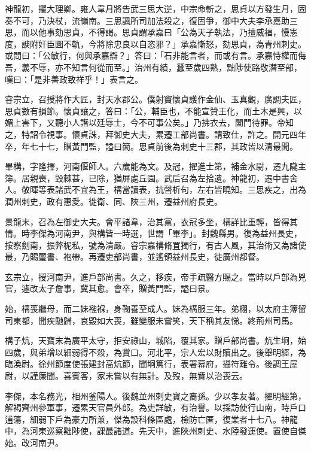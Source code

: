 \begin{pinyinscope}
 神龍初，擢大理卿。雍人韋月將告武三思大逆，中宗命斬之，思貞以方發生月，固奏不可，乃決杖，流嶺南。三思諷所司加法殺之，復固爭，御中大夫李承嘉助三思，而以他事劾思貞，不得謁。思貞謂承嘉曰「公為天子執法，乃擅威福，慢憲度，諛附奸臣圖不軌，今將除忠良以自恣邪？」承嘉慚怒，劾思貞，為青州刺史。或問曰：「公敏行，何與承嘉辯？」答曰：「石非能言者，而或有言。承嘉恃權而侮吾，義不辱，亦不知言何從而至。」治州有績，蠶至歲四熟，黜陟使路敬潛至部，嘆曰：「是非善政致祥乎！」表言之。



 睿宗立，召授將作大匠，封天水郡公。僕射竇懷貞護作金仙、玉真觀，廣調夫匠，思貞數有損節。懷貞讓之，答曰：「公，輔臣也，不能宣贊王化，而土木是興，以媚上害下，又聽小人譖以廷辱士，今不可事公矣。」乃拂衣去，闔門待罪。帝知之，特詔令視事。懷貞誅，拜御史大夫，累遷工部尚書。請致仕，許之。開元四年卒，年七十七，贈黃門監，謚曰簡。思貞前後為刺史十三郡，其政皆以清最聞。



 畢構，字隆擇，河南偃師人。六歲能為文。及冠，擢進士第，補金水尉，遷九隴主簿。居親喪，毀棘甚，已除，猶屏處丘園。武后召為左拾遺。神龍初，遷中書舍人。敬暉等表諸武不宜為王，構當讀表，抗聲析句，左右皆曉知。三思疾之，出為潤州刺史，政有惠愛。徙衛、同、陜三州，遷益州府長史。



 景龍末，召為左御史大夫。會平諸韋，治其黨，衣冠多坐，構詳比重輕，皆得其情。時李傑為河南尹，與構皆一時選，世謂「畢李」。封魏縣男。復為益州長史，按察劍南，振弊柅私，號為清嚴。睿宗嘉構脩罝獨行，有古人風，其治術又為諸使最，乃賜璽書、袍帶。再遷吏部尚書，並遙領益州長史，徙廣州都督。



 玄宗立，授河南尹，進戶部尚書。久之，移疾，帝手疏醫方賜之。當時以戶部為兇官，遽改太子詹事，冀其愈。會卒，贈黃門監，謚曰景。



 始，構喪繼母，而二妹襁褓，身鞠養至成人。妹為構服三年。弟栩，以太府主簿留司東都，聞疾馳歸，哀毀如大喪，雖變服未嘗笑，天下稱其友悌。終荊州司馬。



 構子炕，天寶末為廣平太守，拒安祿山，城陷，覆其家。贈戶部尚書。炕生坰，始四歲，與弟增以細弱得不殺，為賞口。河北平，宗人宏以財贖出之。後舉明經，為臨渙尉。徐州節度使張建封高炕節，聞坰篤行，表署幕府，攝符離令。後調王屋尉，以謹廉聞。喜賓客，家未嘗以有無計。及歿，無貲以治喪云。



 李傑，本名務光，相州釜陽人。後魏並州刺史寶之裔孫。少以孝友著。擢明經第，解褐齊州參軍事，遷累天官員外郎。為吏詳敏，有治譽。以採訪使行山南，時戶口逋蕩，細弱下戶為豪力所兼，傑為設科條區處，檢防亡匿，復業者十七八。神龍中，為河東巡察黜陟使，課最諸道。先天中，進陜州刺史、水陸發運使。置使自傑始。改河南尹。




\end{pinyinscope}

